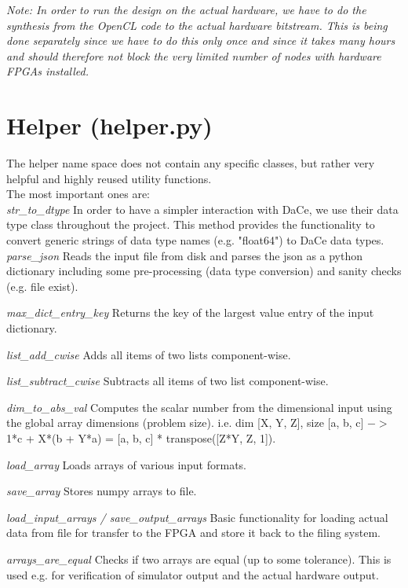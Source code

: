 \textit{Note: In order to run the design on the actual hardware, we have to do the synthesis from the OpenCL code to the actual hardware bitstream. This is being done separately since we have to do this only once and since it takes many hours and should therefore not block the very limited number of nodes with hardware FPGAs installed.}


\section{Helper (helper.py)}
The helper name space does not contain any specific classes, but rather very helpful and highly reused utility functions. \\
The most important ones are: \\
\textit{str\_to\_dtype} In order to have a simpler interaction with DaCe, we use their data type class throughout the project. This method provides the functionality to convert generic strings of data type names (e.g. "float64") to DaCe data types.\\

\textit{parse\_json} Reads the input file from disk and parses the json as a python dictionary including some pre-processing (data type conversion) and sanity checks (e.g. file exist).

\textit{max\_dict\_entry\_key} Returns the key of the largest value entry of the input dictionary. 

\textit{list\_add\_cwise} Adds all items of two lists component-wise.

\textit{list\_subtract\_cwise} Subtracts all items of two list component-wise. 

\textit{dim\_to\_abs\_val} Computes the scalar number from the dimensional input using the global array dimensions (problem size). i.e. dim [X, Y, Z], size [a, b, c] $->$ 1*c + X*(b + Y*a) = [a, b, c] * transpose([Z*Y, Z, 1]). 

\textit{load\_array} Loads arrays of various input formats. 

\textit{save\_array} Stores numpy arrays to file. 

\textit{load\_input\_arrays / save\_output\_arrays} Basic functionality for loading actual data from file for transfer to the FPGA and store it back to the filing system.


\textit{arrays\_are\_equal} Checks if two arrays are equal (up to  some tolerance). This is used e.g. for verification of simulator output and the actual hardware output. 

